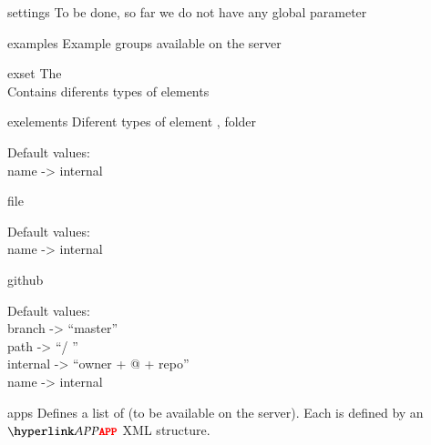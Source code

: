 \bigskip
\xmlstruct
{settings}
{
%
  To be done, so far we do not have any global parameter
%
}
{}

\bigskip
\xmlstruct
{examples}
{
%
 Example groups available on the server
%
}
{}

\bigskip
\xmlstruct
{exset}
{
%
  The 
  \\
  Contains diferents types of elements
%
}
{}

\bigskip
\xmlstruct
{exelements}
{
%
  Diferent types of element
%
}
{, }
\bigskip
\xmlstruct
{folder}
{
%
  Default values:\\
  name -> internal

%
}
{}

\bigskip
\xmlstruct
{file}
{
%
  Default values:\\
  name -> internal

%
}
{}

\bigskip
\xmlstruct
{github}
{
%
  Default values:\\
  branch -> ``master''\\
  path -> ``/ '' \\
  internal -> ``owner + @ + repo''\\
  name -> internal
  
%
}
{}

\bigskip
\xmlstruct
{apps}
{
%
  Defines a list of \apps (to be available on the \ei server). Each
  \app is defined by an $\xmlstructrefwb{APP}$ XML structure.
%
}
{}

